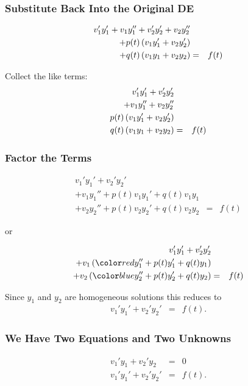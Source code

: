 \begin{frame}
  \frametitle{Substitute Back Into the Original DE}

  \begin{eqnarray*}
    v_1' y_1' + v_1 y_1'' + v_2' y_2' + v_2 y_2'' & & \\
    + p(t) \left( v_1 y_1' + v_2 y_2' \right) & & \\
    + q(t) \left( v_1 y_1 + v_2 y_2 \right) & = & f(t)
  \end{eqnarray*}

  Collect the like terms:
  \begin{eqnarray*}
    v_1' y_1' + v_2' y_2'  & & \\
    + v_1 y_1'' + v_2 y_2'' & & \\
    p(t) \left( v_1 y_1' + v_2 y_2' \right) & & \\
    q(t) \left( v_1 y_1 + v_2 y_2 \right) & = & f(t)
  \end{eqnarray*}


\end{frame}


\begin{frame}
  \frametitle{Factor the Terms}

  \begin{eqnarray*}
    v_1' y_1' + v_2' y_2'  & & \\
    + v_1 y_1'' + p(t) v_1 y_1' + q(t) v_1 y_1 & & \\
    + v_2 y_2'' + p(t) v_2 y_2' + q(t) v_2 y_2 & = & f(t)
  \end{eqnarray*}

  or 

  \begin{eqnarray*}
    v_1' y_1' + v_2' y_2'  & & \\
    + v_1 \lp  \redText{y_1'' + p(t) y_1' + q(t) y_1} \rp & & \\
    + v_2 \lp \blueText{y_2'' + p(t) y_2' + q(t) y_2} \rp & = & f(t)
  \end{eqnarray*}

  Since $y_1$ and $y_2$ are homogeneous solutions this reduces to 
  \begin{eqnarray}
    \label{eqn:secondConstraint}
    v_1' y_1' + v_2' y_2'  & = & f(t).
  \end{eqnarray}


\end{frame}


\begin{frame}
  \frametitle{We Have Two Equations and Two Unknowns}

  \begin{eqnarray*}
    v_1' y_1 + v_2' y_2 & = & 0 \\
    v_1' y_1' + v_2' y_2'  & = & f(t).
  \end{eqnarray*}


\end{frame}



